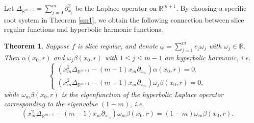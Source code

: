 \documentclass{amsart}
\newtheorem{theorem}{Theorem}[section]
\theoremstyle{definition}
\theoremstyle{remark}
\numberwithin{equation}{section}
\begin{document}
Let $\Delta_{\mathbb{R}^{m+1}}=\sum_{j=0}^{m}\partial_{x_j}^{2}$ be the Laplace operator on $\mathbb{R}^{m+1}$. By choosing a specific root system in Theorem \ref{sm1}, we obtain  the following  connection between  slice regular functions and hyperbolic harmonic functions.
\begin{theorem}
 \label{sld1} Suppose $f$ is  slice regular, and denote $\underline{\omega}=\sum_{j=1}^{m}e_{j}\omega_{j}$ with $\omega_{j}\in \mathbb{R}$. Then  $\alpha(x_{0}, r) $ and   $\omega_{j} \beta(x_{0}, r)$ with $1\le j\le m-1$ are hyperbolic harmonic, i.e.
 \begin{equation} \label{a1}
    \left\{
  \begin{array}{ll}
    \displaystyle\left(x_{m}^{2}\Delta_{\mathbb{R}^{m+1}} -(m-1)x_{m} \partial_{x_{m}}\right)\alpha(x_{0}, r)=0, \\

  \displaystyle \left(x_{m}^{2}\Delta_{\mathbb{R}^{m+1}} -(m-1)x_{m} \partial_{x_{m}}\right) \omega_{j} \beta(x_{0}, r)=0,
  \end{array}
\right.
\end{equation}
while  $ \omega_{m}\beta(x_{0}, r)$ is the eigenfunction of the hyperbolic Laplace operator  corresponding to the eigenvalue $(1-m)$, i.e.
\begin{equation*}
 \left(x_{m}^{2}\Delta_{\mathbb{R}^{m+1}} -(m-1)x_{m} \partial_{x_{m}}\right) \omega_{m}\beta(x_{0}, r)=(1-m) \omega_{m}\beta(x_{0}, r).
\end{equation*}
\end{theorem}
\end{document}
